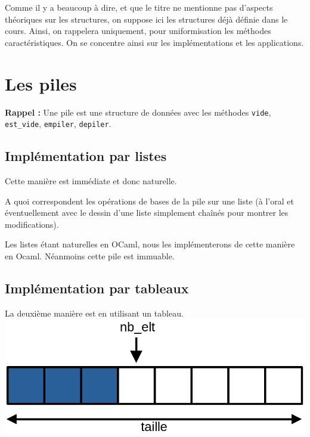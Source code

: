
\begin{com}
	Comme il y a beaucoup à dire, et que le titre ne mentionne pas d'aspects théoriques sur les structures, on suppose ici les structures déjà définie dans le cours. Ainsi, on rappelera uniquement, pour uniformisation les méthodes caractéristiques. On se concentre ainsi sur les implémentations et les applications.
\end{com}

\section{Les piles}

\textbf{Rappel :} Une pile est une structure de données avec les méthodes \texttt{vide}, \texttt{est\_vide}, \texttt{empiler}, \texttt{depiler}.

\subsection{Implémentation par listes}

Cette manière est immédiate et donc naturelle.

\begin{exercise}
	A quoi correspondent les opérations de bases de la pile sur une liste (à l'oral et éventuellement avec le dessin d'une liste simplement chaînés pour montrer les modifications).
\end{exercise}

Les listes étant naturelles en OCaml, nous les implémenterons de cette manière en Ocaml. Néanmoins cette pile est immuable.

\subsection{Implémentation par tableaux}

La deuxième manière est en utilisant un tableau. \\

\includegraphics[scale=0.3]{lecon/05-piles_files/piles_tableau.png}
\\

